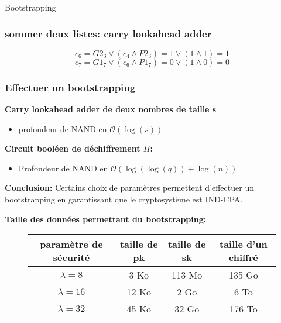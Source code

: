 \documentclass[10pt,xcolor={usenames,dvipsnames}]{beamer}
\begin{document}
\begin{section}{Bootstrapping}

\begin{frame} 
\frametitle{sommer deux listes: carry lookahead adder}
  \begin{figure}
    \begin{center}
      \begin{tikzpicture}[scale = 0.7, transform shape]
      	
      \end{tikzpicture}
    \end{center}
  \end{figure}
\[c_6 = G2_3 \vee \left( c_4 \wedge P2_3\right) = 1 \vee \left( 1 \wedge 1 \right) = 1 \]
\[c_7 = G1_7 \vee \left( c_6 \wedge P1_7\right) = 0 \vee \left( 1 \wedge 0 \right) = 0 \]
\end{frame} 




\begin{frame} 
\frametitle{Effectuer un bootstrapping}



\textbf{Carry lookahead adder de deux nombres de taille s}
\begin{itemize}
\item profondeur de NAND  en $\mathcal{O}(\log(s))$
\end{itemize}

\textbf{Circuit booléen de déchiffrement $\Pi$:}
\begin{itemize}
\item Profondeur de NAND en $\mathcal{O}(\log(\log(q)) + \log(n))$
\end{itemize}

\textbf{Conclusion:}
Certains choix de paramètres permettent d'effectuer un bootstrapping en garantissant que le cryptosystème est IND-CPA.
\pause

\textbf{Taille des données permettant du bootstrapping:}
\begin{figure}
\begin{tabular}{|c|c|c|c|}
\hline
paramètre de sécurité & taille de pk & taille de sk & taille d'un chiffré \\
\hline
$\lambda = 8$ & 3 Ko & 113 Mo & 135 Go \\
\hline
$\lambda = 16$ & 12 Ko & 2 Go & 6 To \\
\hline
$\lambda = 32$ & 45 Ko & 32 Go & 176 To \\
\hline
\end{tabular}
\end{figure}
\end{frame}

\end{section}
\end{document}
